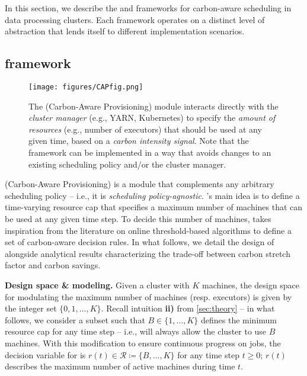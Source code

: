 In this section, we describe the \CAP and \DANISH frameworks for carbon-aware scheduling in data processing clusters.  Each framework operates on a distinct level of abstraction that lends itself to different implementation scenarios.




\subsection{\CAP framework} \label{sec:cap-design}

\begin{figure}[h]
    \centering \vspace{-1em}
    \texttt{[image: figures/CAPfig.png]}
    \caption{The \CAP (Carbon-Aware Provisioning) module interacts directly with the \textit{cluster manager} (e.g., YARN, Kubernetes) to specify the \textit{amount of resources} (e.g., number of executors) that should be used at any given time, based on a \textit{carbon intensity signal}.  Note that the \CAP framework can be implemented in a way that avoids changes to an existing scheduling policy and/or the cluster manager.}
    \label{fig:cap-diagram}
\end{figure}

\CAP (Carbon-Aware Provisioning) is a module that complements any arbitrary scheduling policy -- i.e., it is \textit{scheduling policy-agnostic}.  \CAP's main idea is to define a time-varying resource cap that specifies a maximum number of machines that can be used at any given time step.  To decide this number of machines, \CAP takes inspiration from the literature on online threshold-based algorithms to define a set of carbon-aware decision rules.  In what follows, we detail the design of \CAP alongside analytical results characterizing the trade-off between carbon stretch factor and carbon savings.

\smallskip
\noindent\textbf{Design space \& modeling. } Given a cluster with $K$ machines, the design space for modulating the maximum number of machines (resp. executors) is given by the integer set $\{0, 1, \dots, K\}$.  Recall intuition \textbf{ii)} from \autoref{sec:theory} -- in what follows, we consider a subset such that $B \in \{1, \dots, K\}$ defines the minimum resource cap for any time step -- i.e., \CAP will always allow the cluster to use $B$ machines.
With this modification to ensure continuous progress on jobs, the decision variable for \CAP is $r(t) \in \mathcal{R} \coloneqq \{B, \dots, K\}$ for any time step $t \geq 0$; $r(t)$ describes the maximum number of active machines during time $t$.  

